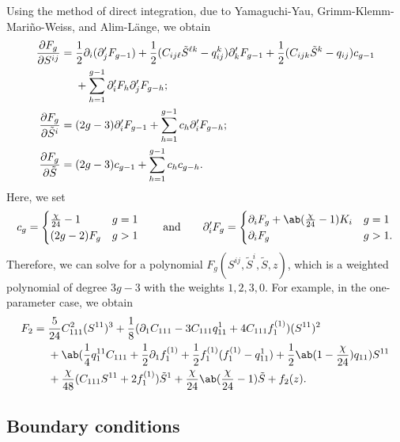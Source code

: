 \documentclass[10pt]{amsart}
\theoremstyle{definition}
\theoremstyle{remark}
\theoremstyle{plain}
\theoremstyle{definition}
\theoremstyle{remark}
\newcommand{\1}{\mathbf{1}}
\newcommand{\2}{\mathbf{2}}
\newcommand{\3}{\mathbf{3}}
\begin{document}
Using the method of direct integration, due to Yamaguchi-Yau, Grimm-Klemm-Mari\~{n}o-Weiss, and Alim-L\"ange, we obtain
\begin{align*}
    \pdv{F_g}{S^{ij}} ={}& \frac{1}{2} \partial_i (\partial_j' F_{g-1}) +\frac{1}{2} (C_{ij\ell}\tilde{S}^{\ell k} - q_{ij}^k) \partial_k' F_{g-1} + \frac{1}{2} (C_{ijk}\tilde{S}^k - q_{ij}) c_{g-1} \\
    &+ \sum_{h=1}^{g-1} \partial_i' F_h \partial_j' F_{g-h}; \\
    \pdv{F_g}{\tilde{S}^i} ={}& (2g-3) \partial_i' F_{g-1} + \sum_{h=1}^{g-1} c_h \partial_i' F_{g-h}; \\
    \pdv{F_g}{\tilde{S}} ={}& (2g-3) c_{g-1} + \sum_{h=1}^{g-1} c_h c_{g-h}.
\end{align*}
Here, we set
\[ c_g = \begin{cases}
    \frac{\chi}{24}-1 & g=1 \\
    (2g-2) F_g & g > 1
\end{cases} \qquad  \text{and} \qquad \partial_i' F_g = \begin{cases}
    \partial_i F_g + \ab(\frac{\chi}{24}-1)K_i & g=1 \\
    \partial_i F_g & g > 1.
\end{cases}
\]
Therefore, we can solve for a polynomial $F_g(S^{ij}, \tilde{S}^i, \tilde{S}, z)$, which is a weighted polynomial of degree $3g-3$ with the weights $1,2,3,0$. For example, in the one-parameter case, we obtain
\begin{align*}
    F_2 ={}& \frac{5}{24} C_{111}^2 (S^{11})^3 + \frac{1}{8}(\partial_1 C_{111} - 3 C_{111}q_{11}^1 + 4 C_{111} f_1^{(1)})(S^{11})^2 \\
    &+ \ab(\frac{1}{4} q_1^{11} C_{111} + \frac{1}{2}\partial_1 f_1^{(1)} +\frac{1}{2} f_1^{(1)}(f_1^{(1)}- q_{11}^1) + \frac{1}{2} \ab(1-\frac{\chi}{24})q_{11})S^{11} \\
    &+ \frac{\chi}{48}(C_{111}S^{11}+2f_1^{(1)})\tilde{S}^1 + \frac{\chi}{24}\ab(\frac{\chi}{24}-1)\tilde{S} + f_2(z).
\end{align*}


\subsection{Boundary conditions}%
\label{sub:Boundary conditions}
\end{document}
